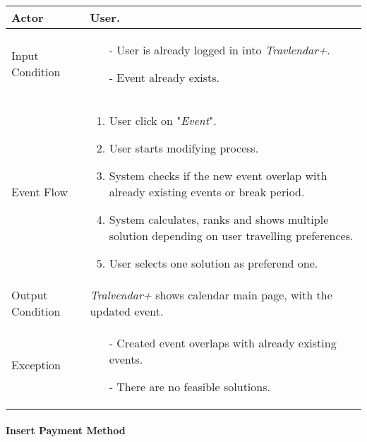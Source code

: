 		\begin{tabular}{| l | p{} | }
			\hline
			\hline
			Actor	&		User. \\
			\hline
			Input Condition		&		\begin{itemize}
													\item[-] User is already logged in into \textit{Travlendar+}.
													\item[-] Event already exists.
												\end{itemize} \\
			\hline
			Event Flow		&		\begin{enumerate}
												\item User click on "\textit{Event}".
												\item User starts modifying process.
												\item System checks if the new event overlap with already existing events or break period.
												\item	 System calculates, ranks and shows multiple solution depending on user travelling preferences.
												\item User selects one solution as preferend one.
											\end{enumerate} \\
			\hline
			Output Condition		&		\textit{Tralvendar+} shows calendar main page, with the updated event. \\
			\hline		
			Exception		&		\begin{itemize}
											\item[-] Created event overlaps with already existing events.
											\item[-] There are no feasible solutions.
										\end{itemize} \\
			\hline
			\hline
		\end{tabular}
		
		

	\paragraph{Insert Payment Method}
	
